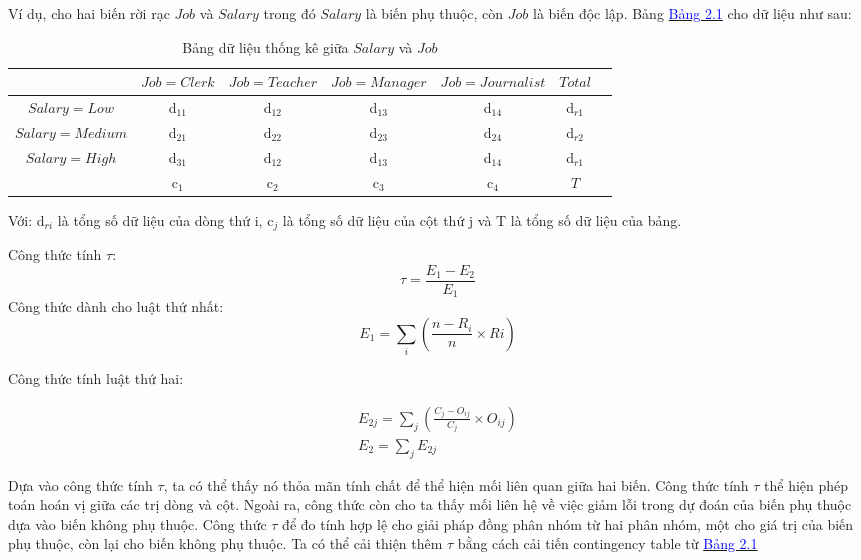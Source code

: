 \hspace*{10mm}Ví dụ, cho hai biến rời rạc $Job$ và $Salary$ trong đó $Salary$ là biến phụ thuộc, còn $Job$ là biến độc lập. Bảng \hyperref[bang_2_1]{\textcolor{blue}{Bảng 2.1}} cho dữ liệu như sau:
\noindent
\begin{table}[ht]
\begin{center}
\begin{tabular}{|c|c|c|c|c|c|c|}
\hline
& $Job=Clerk$ & $Job=Teacher$ & $Job=Manager$ & $Job=Journalist$ & $Total$ \\
\hline
\hline
$Salary=Low$ & d$_{11}$ & d$_{12}$ & d$_{13}$ & d$_{14}$ & d$_{r1}$ \\
\hline
$Salary=Medium$ & d$_{21}$ & d$_{22}$ & d$_{23}$ & d$_{24}$ & d$_{r2}$ \\
\hline
$Salary=High$ & d$_{31}$ & d$_{12}$ & d$_{13}$ & d$_{14}$ & d$_{r1}$ \\
\hline
& c$_{1}$ & c$_{2}$ & c$_{3}$ & c$_{4}$ & $T$\\
\hline
\end{tabular}
\caption[Bảng dữ liệu giữa $Salary$ và $Job$ ]{Bảng dữ liệu thống kê giữa $Salary$ và $Job$}
\label{bang_2_1}
\end{center}
\end{table}

\hspace{10mm}Với: d$_{ri}$ là tổng số dữ liệu của dòng thứ i, c$_{j}$ là tổng số dữ liệu của cột thứ j và T là tổng số dữ liệu của bảng.

Công thức tính $\tau$:
\begin{equation}
\tau = \frac{E_1 - E_2}{E_1}
\end{equation}
Công thức dành cho luật thứ nhất:
\begin{equation}
E_1 = \sum_i(\frac{n - R_i}{n} \times Ri)
\end{equation}

Công thức tính luật thứ hai:

\begin{equation}
\begin{matrix}
E_{2j} = \sum_j(\frac{C_j - O_{ij}}{C_j} \times O_{ij}) \\
E_2 = \sum_jE_{2j}
\end{matrix}
\end{equation}

\hspace{10mm}Dựa vào công thức tính $\tau$, ta có thể thấy nó thỏa mãn tính chất để thể hiện mối liên quan giữa hai biến. Công thức tính $\tau$ thể hiện phép toán hoán vị giữa các trị dòng và cột. Ngoài ra, công thức còn cho ta thấy mối liên hệ về việc giảm lỗi trong dự đoán của biến phụ thuộc dựa vào biến không phụ thuộc. Công thức $\tau$ để đo tính hợp lệ cho giải pháp đồng phân nhóm từ hai phân nhóm, một cho giá trị của biến phụ thuộc, còn lại cho biến không phụ thuộc. Ta có thể cải thiện thêm $\tau$ bằng cách cải tiến contingency table từ \hyperref[bang_2_1]{\textcolor{blue}{Bảng 2.1}}

